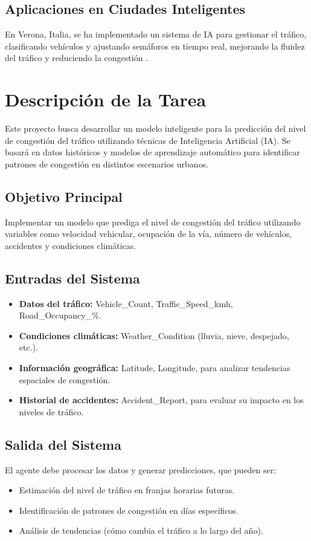 \documentclass{svproc} %
\begin{document}
\subsection{Aplicaciones en Ciudades Inteligentes}
En Verona, Italia, se ha implementado un sistema de IA para gestionar el tráfico,
clasificando vehículos y ajustando semáforos en tiempo real, mejorando la fluidez
del tráfico y reduciendo la congestión \cite{Euronews2024}.


\section{Descripción de la Tarea}
Este proyecto busca desarrollar un modelo inteligente para la predicción del nivel de
congestión del tráfico utilizando técnicas de Inteligencia Artificial (IA). Se basará en
datos históricos y modelos de aprendizaje automático para identificar patrones de
congestión en distintos escenarios urbanos.

\subsection{Objetivo Principal}
Implementar un modelo que prediga el nivel de congestión del tráfico utilizando
variables como velocidad vehicular, ocupación de la vía, número de vehículos, accidentes
y condiciones climáticas.

\subsection{Entradas del Sistema}
\begin{itemize}
    \item \textbf{Datos del tráfico:} Vehicle\_Count, Traffic\_Speed\_kmh, Road\_Occupancy\_\%.
    \item \textbf{Condiciones climáticas:} Weather\_Condition (lluvia, nieve, despejado, etc.).
    \item \textbf{Información geográfica:} Latitude, Longitude, para analizar tendencias espaciales de congestión.
    \item \textbf{Historial de accidentes:} Accident\_Report, para evaluar su impacto en los niveles de tráfico.
\end{itemize}

\subsection{Salida del Sistema}
El agente debe procesar los datos y generar predicciones, que pueden ser:
\begin{itemize}
    \item Estimación del nivel de tráfico en franjas horarias futuras.
    \item Identificación de patrones de congestión en días específicos.
    \item Análisis de tendencias (cómo cambia el tráfico a lo largo del año).
\end{itemize}
\end{document}
